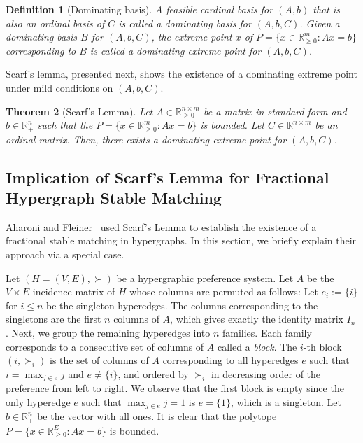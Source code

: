 \documentclass[11pt]{article}
\newcommand{\R}{\mathbb{R}}
\newtheorem{theorem}{Theorem}
\newtheorem{definition}[theorem]{Definition}
\begin{document}
\begin{definition}[Dominating basis]
    A feasible cardinal basis for $(A,b)$ that is also an ordinal basis of $C$ is called a \emph{dominating basis} for $(A,b,C)$. Given a dominating basis $B$ for $(A,b,C)$, 
the extreme point $x$ of $P=\{x \in \mathbb{R}^{m}_{\ge 0} : Ax = b\}$ corresponding to $B$ is called a \emph{dominating extreme point} for $(A,b,C)$.
\end{definition}
 

Scarf's lemma, presented next, shows the existence of a dominating extreme point under mild conditions on $(A, b, C)$.

\begin{theorem}[Scarf's Lemma]\label{thm:scarflemma}
Let $A\in \R^{n \times m}_{\ge 0}$ be a matrix in standard form and $b\in\R^n_{+}$ such that the 
$P=\{x\in \R^m_{\ge 0}: Ax=b\}$ is bounded. 
Let $C \in \R^{n \times m}$ be an ordinal matrix. Then, there exists a dominating extreme point for $(A,b,C)$. 
\end{theorem}


\subsection{Implication of Scarf's Lemma for Fractional Hypergraph Stable Matching}\label{sec:pre-Scarf-SM}


Aharoni and Fleiner~\cite{aharoni2003lemma} used Scarf's Lemma to establish the existence of a fractional stable matching in hypergraphs. In this section, we briefly explain their approach via a special case. 

\iffalse
Let $(H=(V,E),\succ)$ be a hypergraphic preference system. Let $A$ be the $V\times E$ incidence matrix of $H$ whose columns are permuted as follows: Let $e_i:=\{i\}$ for $i\le n$ be the singleton hyperedges. The columns corresponding to the singletons are the first $n$ columns of $A$, which gives exactly the identity matrix $I_n$. Next, we group the remaining hyperedges into $n$ families. Each family corresponds to a consecutive set of columns of $A$ called a \emph{block}. The $i$-th block $(i, \succ_{i})$ is the set of columns of $A$ corresponding to all hyperedges $e$ such that $i=\max_{j\in e} j$ and $e\neq\{i\}$, and ordered by $\succ_{i}$ in decreasing order of the preference from left to right. We observe that the first block is empty since the only hyperedge $e$ such that $\max_{j\in e} j=1$ is $e=\{1\}$, which is a singleton. Let $b\in\mathbb{R}^n_+$ be the vector with all ones. It is clear that the polytope $P=\{x\in \R^E_{\ge 0}: Ax=b\}$ is bounded. 
\end{document}
